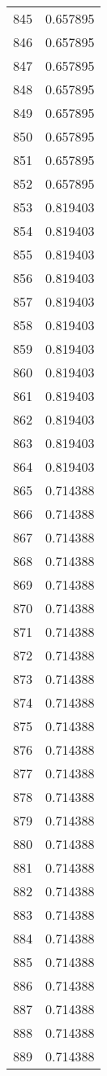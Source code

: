 \documentclass[12pt]{article}
\begin{document}
\begin{longtable}{@{}cc@{}}
845 & 0.657895 \\
846 & 0.657895 \\
847 & 0.657895 \\
848 & 0.657895 \\
849 & 0.657895 \\
850 & 0.657895 \\
851 & 0.657895 \\
852 & 0.657895 \\
853 & 0.819403 \\
854 & 0.819403 \\
855 & 0.819403 \\
856 & 0.819403 \\
857 & 0.819403 \\
858 & 0.819403 \\
859 & 0.819403 \\
860 & 0.819403 \\
861 & 0.819403 \\
862 & 0.819403 \\
863 & 0.819403 \\
864 & 0.819403 \\
865 & 0.714388 \\
866 & 0.714388 \\
867 & 0.714388 \\
868 & 0.714388 \\
869 & 0.714388 \\
870 & 0.714388 \\
871 & 0.714388 \\
872 & 0.714388 \\
873 & 0.714388 \\
874 & 0.714388 \\
875 & 0.714388 \\
876 & 0.714388 \\
877 & 0.714388 \\
878 & 0.714388 \\
879 & 0.714388 \\
880 & 0.714388 \\
881 & 0.714388 \\
882 & 0.714388 \\
883 & 0.714388 \\
884 & 0.714388 \\
885 & 0.714388 \\
886 & 0.714388 \\
887 & 0.714388 \\
888 & 0.714388 \\
889 & 0.714388 \\

\end{longtable}
\end{document}

